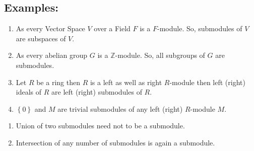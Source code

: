 \subsection{Examples:}
\begin{enumerate}
	\item As every Vector Space $V$ over a Field $F$ is a $F$-module. So, submodules of $V$ are subspaces of $V$.
	\item As every abelian group $G$ is a $\mathbb{Z}$-module. So, all subgroups of $G$ are submodules.
	\item Let $R$ be a ring then $R$ is a left as well as right $R$-module then left (right) ideals of $R$ are left (right) submodules of $R$.
	\item $\left\{0\right\}$ and $M$ are trivial submodules of any left (right) $R$-module $M$.
\end{enumerate}
\bigskip
\begin{remark}\qquad
	\begin{enumerate}
		\item Union of two submodules need not to be a submodule.
		
		\item Intersection of any number of submodules is again a submodule.
	\end{enumerate}
\end{remark}
\bigskip	


